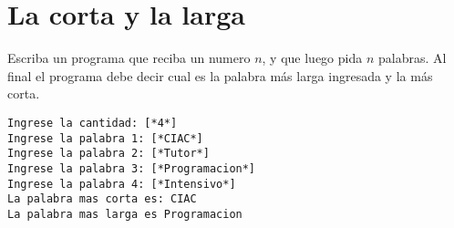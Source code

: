 
\section{La corta y la larga}

Escriba un programa que reciba un numero $n$, y que luego pida $n$ palabras. Al final el programa debe decir cual es la palabra más larga ingresada y la más corta.

\begin{lstlisting}[style=consola]
Ingrese la cantidad: [*4*]
Ingrese la palabra 1: [*CIAC*]
Ingrese la palabra 2: [*Tutor*]
Ingrese la palabra 3: [*Programacion*]
Ingrese la palabra 4: [*Intensivo*]
La palabra mas corta es: CIAC
La palabra mas larga es Programacion
\end{lstlisting}
